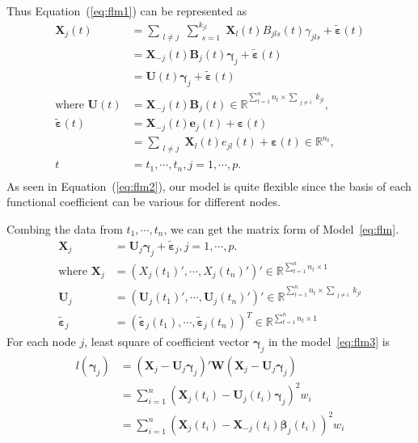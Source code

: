 \documentclass[11pt]{article}
\newcommand{\R}{\mathbb R}
\newcommand{\bX}{\mathbf X}
\newcommand{\bB}{\mathbf B}
\newcommand{\bU}{\mathbf U}
\newcommand{\bW}{\mathbf W}
\newcommand{\be}{\mathbf e}
\newcommand{\bbeta}{{\boldsymbol{\beta}}}
\newcommand{\bvarepsilon}{\boldsymbol{\varepsilon}}
\newcommand{\bgamma}{\boldsymbol{\gamma}}
\begin{document}
Thus Equation~(\ref{eq:flm1}) can be represented as
\begin{equation}
	\label{eq:flm2}
	\begin{aligned}
	\bX_j(t) &= \sum_{\substack{l \neq j}} \sum_{\substack{s=1}}^{k_{jl}} \bX_l(t) B_{jls}(t) \gamma_{jls} + \tilde{\bvarepsilon}(t) \\
	         &= \bX_{-j}(t) \bB_j(t)\bgamma_j + \tilde{\bvarepsilon}(t) \\
	         &= \bU(t)\bgamma_j + \tilde{\bvarepsilon}(t) \\
	\text{where }\bU(t)      &= \bX_{-j}(t) \bB_j(t)\in \R^{\sum_{t = 1}^{n}n_t \times \sum_{\substack{j \neq i}}k_{jl}},\\
	\tilde{\bvarepsilon}(t) &= \bX_{-j}(t)\be_j(t) + \bvarepsilon(t)\\
	                        &= \sum_{\substack{l \neq j}} \bX_l(t)e_{jl}(t) + \bvarepsilon(t) \in \R^{n_t},\\
	t &= t_1, \cdots, t_n, j = 1, \cdots, p.\\
	\end{aligned}
\end{equation}
As seen in Equation~(\ref{eq:flm2}), our model is quite flexible since the basis of each functional coefficient can be various for different nodes.


Combing the data from $t_1, \cdots, t_n$, we can get the matrix form of Model~\ref{eq:flm}.
\begin{equation}
    \label{eq:flm3}
	\begin{aligned}
	\bX_j &= \bU_j \bgamma_j + \tilde{\bvarepsilon}_j, j = 1, \cdots, p.\\
	\text{where }\bX_j &= (X_j(t_1)', \cdots, X_j(t_n)')' \in \R^{\sum_{t = 1}^{n}n_t \times 1}\\
	\bU_j &= ( \bU_j(t_1)', \cdots, \bU_j(t_n)' )' \in \R^{\sum_{t = 1}^{n}n_t \times \sum_{\substack{j \neq i}}k_{jl}}\\
	\tilde{\bvarepsilon}_j &= (\tilde{\bvarepsilon}_j(t_1), \cdots, \tilde{\bvarepsilon}_j(t_n))^T \in \R^{\sum_{t = 1}^{n}n_t \times 1}
	\end{aligned}	
\end{equation}
	For each node $j$, least square of coefficient vector $\bgamma_j$ in the model~\ref{eq:flm3} is
    $$\begin{aligned}
	l(\bgamma_j) &= (\bX_j - \bU_j \bgamma_j)'\bW (\bX_j - \bU_j \bgamma_j)\\
	&= \sum_{i = 1}^{n}(\bX_j(t_i) - \bU_j(t_i) \bgamma_j)^2 w_i\\
	&= \sum_{i = 1}^{n}(\bX_j(t_i) - \bX_{-j}(t_i) \bbeta_j(t_i))^2 w_i\\
	\end{aligned}$$
 
\end{document}
